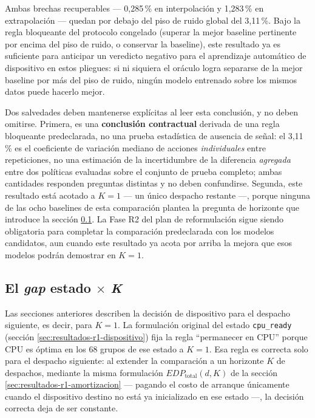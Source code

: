 \documentclass[12pt,oneside,spanish]{book}
\begin{document}
Ambas brechas recuperables --- 0,285\,\% en interpolación y 1,283\,\% en extrapolación --- quedan por debajo del piso de ruido global del 3,11\,\%. Bajo la regla bloqueante del protocolo congelado (superar la mejor baseline pertinente por encima del piso de ruido, o conservar la baseline), este resultado ya es suficiente para anticipar un veredicto negativo para el aprendizaje automático de dispositivo en estos pliegues: si ni siquiera el oráculo logra separarse de la mejor baseline por más del piso de ruido, ningún modelo entrenado sobre los mismos datos puede hacerlo mejor.

Dos salvedades deben mantenerse explícitas al leer esta conclusión, y no deben omitirse. Primera, es una \textbf{conclusión contractual} derivada de una regla bloqueante predeclarada, no una prueba estadística de ausencia de señal: el 3,11\,\% es el coeficiente de variación mediano de acciones \textit{individuales} entre repeticiones, no una estimación de la incertidumbre de la diferencia \textit{agregada} entre dos políticas evaluadas sobre el conjunto de prueba completo; ambas cantidades responden preguntas distintas y no deben confundirse. Segunda, este resultado está acotado a $K=1$ --- un único despacho restante ---, porque ninguna de las ocho baselines de esta comparación plantea la pregunta de horizonte que introduce la sección \ref{sec:resultados-r1-gap-estado-k}. La Fase R2 del plan de reformulación sigue siendo obligatoria para completar la comparación predeclarada con los modelos candidatos, aun cuando este resultado ya acota por arriba la mejora que esos modelos podrán demostrar en $K=1$.

\subsection{El \textit{gap} estado \texorpdfstring{$\times$}{x} \textit{K}}
\label{sec:resultados-r1-gap-estado-k}

Las secciones anteriores describen la decisión de dispositivo para el despacho siguiente, es decir, para $K=1$. La formulación original del estado \texttt{cpu\_ready} (sección \ref{sec:resultados-r1-dispositivo}) fija la regla ``permanecer en CPU'' porque CPU es óptima en los 68 grupos de ese estado a $K=1$. Esa regla es correcta solo para el despacho siguiente: al extender la comparación a un horizonte $K$ de despachos, mediante la misma formulación $EDP_{\text{total}}(d, K)$ de la sección \ref{sec:resultados-r1-amortizacion} --- pagando el costo de arranque únicamente cuando el dispositivo destino no está ya inicializado en ese estado ---, la decisión correcta deja de ser constante.
\end{document}

